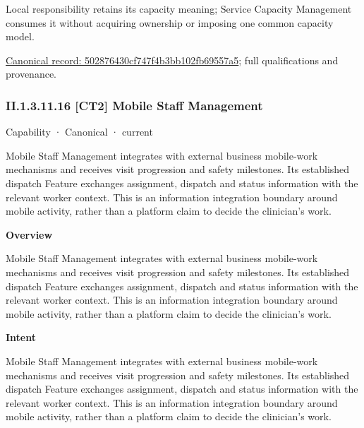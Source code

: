 Local responsibility retains its capacity meaning; Service Capacity Management consumes it without acquiring ownership or imposing one common capacity model.


{\footnotesize \href{../../../../continuum/strategy/capability/feature/502876430cf747f4b3bb102fb69557a5.md}{Canonical record: 502876430cf747f4b3bb102fb69557a5}; full qualifications and provenance.}\par
\subsubsection*{II.1.3.11.16 [CT2] Mobile Staff Management}
\label{navigation:II.1.3.11.16}

\label{element:79a4a48fddf74c69acf7e16404d06ea5}
{\small Capability · Canonical · current}\par

Mobile Staff Management integrates with external business mobile-work mechanisms and receives visit progression and safety milestones. Its established dispatch Feature exchanges assignment, dispatch and status information with the relevant worker context. This is an information integration boundary around mobile activity, rather than a platform claim to decide the clinician's work.



\textbf{Overview}



Mobile Staff Management integrates with external business mobile-work mechanisms and receives visit progression and safety milestones. Its established dispatch Feature exchanges assignment, dispatch and status information with the relevant worker context. This is an information integration boundary around mobile activity, rather than a platform claim to decide the clinician's work.



\textbf{Intent}



Mobile Staff Management integrates with external business mobile-work mechanisms and receives visit progression and safety milestones. Its established dispatch Feature exchanges assignment, dispatch and status information with the relevant worker context. This is an information integration boundary around mobile activity, rather than a platform claim to decide the clinician's work.




